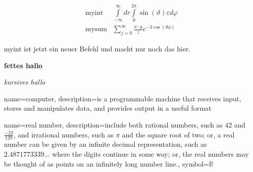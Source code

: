 \documentclass[12pt, a4paper, twopage]{scrartcl}
\begin{document}
\begin{appendix}
\newcommand{\myint}{\int\limits_{-\infty}^{\infty} dr \int\limits_{0}^{2 \pi} \sin(\vartheta) \varepsilon d\varphi}

\newcommand{\mysum}[3]{\sum\limits_{j = 0}^{\infty} \frac{#1\cdot #2}{#3} e^{- 3 \cos(\theta \phi)}}

\begin{align*}
  &\text{myint} & \myint\\
  &\text{mysum} & \mysum{x}{y}{z}
\end{align*}

\renewcommand{\myint}{myint ist jetzt ein neuer Befehl und macht nur noch das hier.}

\myint

\vspace{2cm}
\newcommand{\fett}[1]{{\bf #1}}

\fett{fettes hallo}

\newcommand{\kursiv}[1]{{\it #1}}

\kursiv{kursives hallo}



\end{appendix}







\printbibliography











{
	name=computer,
	description={is a programmable machine that receives input,
		stores and manipulates data, and provides
		output in a useful format}
}


{
	name={real number},
	description={include both rational numbers, such as $42$ and 
		$\frac{-23}{129}$, and irrational numbers, 
		such as $\pi$ and the square root of two; or,
		a real number can be given by an infinite decimal
		representation, such as $2.4871773339\ldots$ where
		the digits continue in some way; or, the real
		numbers may be thought of as points on an infinitely
		long number line.},
	symbol={\ensuremath{\mathbb{R}}}
}


\printglossary[title=My Glossary, toctitle=Glossary Title in ToC ]
\end{document}
